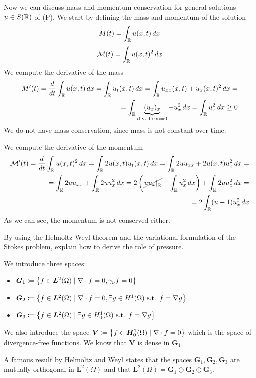 Now we can discuss mass and momentum conservation for general solutions \(u \in
S(\mathbb{R})\) of (P). We start by defining the mass and momentum of the solution
\[
    M(t) = \int_{\mathbb{R}} u(x,t) \, dx
\]
\[
    \mathcal{M}(t) = \int_{\mathbb{R}} u(x,t)^2 \, dx
\]
We compute the derivative of the mass
\[
    \begin{split}
        M'(t) = \frac{d}{dt} \int_{\mathbb{R}} u(x,t) \, dx = \int_{\mathbb{R}} u_t(x,t) \, dx = \int_{\mathbb{R}} u_{xx}(x,t) + u_x(x,t)^2 \, dx = \\
        = \int_{\mathbb{R}} \underbrace{(u_x)_x}_{\text{div. form} = 0} + u_x^2 \, dx = \int_{\mathbb{R}} u_x^2 \, dx \geq 0
    \end{split}
\]
We do not have mass conservation, since mass is not constant over time.

We compute the derivative of the momentum
\[
    \begin{split}
        \mathcal{M}'(t) = \frac{d}{dt} \int_{\mathbb{R}} u(x,t)^2 \, dx = \int_{\mathbb{R}} 2 u(x,t) u_t(x,t) \, dx = \int_{\mathbb{R}} 2 u u_{xx} + 2 u(x,t) u_x^2 \, dx =                   \\
        = \int_{\mathbb{R}} 2 u u_{xx} + \int_{\mathbb{R}} 2 u u_x^2 \, dx = 2\left(\cancel{\left. u u_x \right|_{\mathbb{R}}} - \int_{\mathbb{R}} u_x^2 \, dx\right) + \int_{\mathbb{R}} 2 u u_x^2 \, dx = \\
        = 2 \int_{\mathbb{R}} (u - 1) u_x^2 \, dx
    \end{split}
\]
As we can see, the momentum is not conserved either.

\newpage
\begin{exercise}
    By using the Helmoltz-Weyl theorem and the variational formulation of the Stokes problem, explain how to derive the role of pressure.
\end{exercise}
\begin{remark}
    We introduce three spaces:
    \begin{itemize}
        \item \(\bm{G}_1 \coloneqq \left\{ f \in \bm{L}^2(\Omega) \mid \nabla \cdot f = 0, \gamma_\nu f = 0 \right\}\)
        \item \(\bm{G}_2 \coloneqq \left\{ f \in \bm{L}^2(\Omega) \mid \nabla \cdot f = 0, \exists g \in H^1(\Omega) \text{ s.t. } f = \nabla g \right\}\)
        \item \(\bm{G}_3 \coloneqq \left\{ f \in \bm{L}^2(\Omega) \mid \exists g \in H^1_0(\Omega) \text{ s.t. } f = \nabla g \right\}\)
    \end{itemize}
    We also introduce the space \(\bm{V} \coloneqq \left\{ f \in \bm{H}^1_0(\Omega) \mid \nabla \cdot f = 0 \right\}\) which is the space of divergence-free functions.
    We know that \(\bm{V}\) is dense in \(\bm{G}_1\).

    A famous result by Helmoltz and Weyl states that the spaces \(\bm{G}_1,
    \bm{G}_2, \bm{G}_3\) are mutually orthogonal in \(\bm{L}^2(\Omega)\) and that
    \(\bm{L}^2(\Omega) = \bm{G}_1 \oplus \bm{G}_2 \oplus \bm{G}_3\).
\end{remark}

